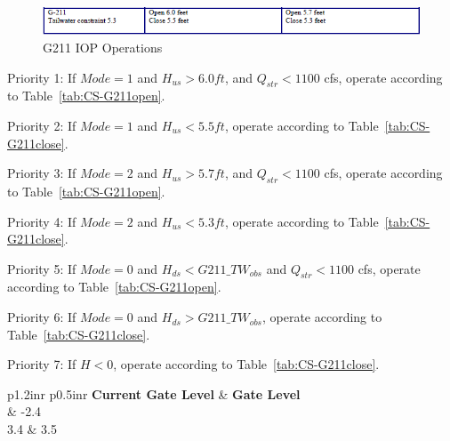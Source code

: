 
\begin{figure}[!h]
  \begin{center}
  \includegraphics[width=6.5in]{../figs/G211_IOPops.png}
  \caption{G211 IOP Operations}
  \label{fig:G211iop}
  \end{center}
\end{figure}


\begin{packed_items}
\item Priority 1: If $Mode=1$ and $H_{us}>6.0 ft$, and $Q_{str}<1100$ cfs, operate according to Table~\ref{tab:CS-G211open}.
\item Priority 2: If $Mode=1$ and $H_{us}<5.5 ft$, operate according to Table~\ref{tab:CS-G211close}.
\item[]
\item Priority 3: If $Mode=2$ and $H_{us}>5.7 ft$, and $Q_{str}<1100$ cfs, operate according to Table~\ref{tab:CS-G211open}.
\item Priority 4: If $Mode=2$ and $H_{us}<5.3 ft$, operate according to Table~\ref{tab:CS-G211close}.
\item[]
\item Priority 5: If $Mode=0$ and $H_{ds}<G211\_TW_{obs}$ and $Q_{str}<1100$ cfs, operate according to Table~\ref{tab:CS-G211open}.
\item Priority 6: If $Mode=0$ and $H_{ds}>G211\_TW_{obs}$, operate according to Table~\ref{tab:CS-G211close}.
\item[]
\item Priority 7: If $H<0$, operate according to Table~\ref{tab:CS-G211close}.
\end{packed_items}


\footnotesize
\begin{table}[!h]
\centering
\caption{Control strategy for G211 open (units are ft. NGVD29)}
\label{tab:CS-G211open}
\begin{tabular}{p{1.2in}{r} p{0.5in}{r}}
\hline
\textbf{Current Gate Level} & \textbf{Gate Level}\\
	& -2.4       \\
3.4	& 3.5   \\
\hline
\end{tabular}
\end{table}
\normalsize

